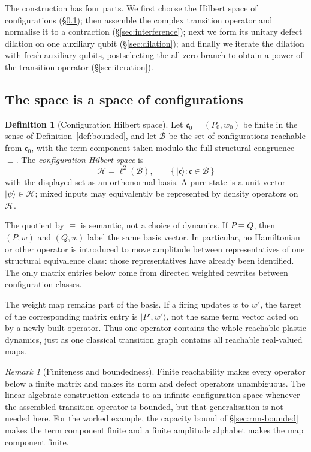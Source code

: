 \documentclass[11pt,a4paper]{article}
\theoremstyle{plain}
\theoremstyle{definition}
\newtheorem{definition}[theorem]{Definition}
\theoremstyle{remark}
\newtheorem{remark}[theorem]{Remark}
\newcommand{\wmap}{w}
\begin{document}
The construction has four parts. We first choose the Hilbert space of configurations
(\S\ref{sec:qspace}); then assemble the complex transition operator and normalise it to a contraction
(\S\ref{sec:interference}); next we form its unitary defect dilation on one auxiliary qubit
(\S\ref{sec:dilation}); and finally we iterate the dilation with fresh auxiliary qubits, postselecting the
all-zero branch to obtain a power of the transition operator (\S\ref{sec:iteration}).

\subsection{The space is a space of configurations}
\label{sec:qspace}

\begin{definition}[Configuration Hilbert space]
\label{def:hilbert}
Let $\mathfrak{c}_0=(P_0,\wmap_0)$ be finite in the sense of
Definition~\ref{def:bounded}, and let $\mathcal{B}$ be the set of configurations reachable from
$\mathfrak{c}_0$, with the term component taken modulo the full structural congruence $\equiv$. The
\emph{configuration Hilbert space} is
\[
\mathcal{H}=\ell^2(\mathcal{B}),
\qquad
\big\{\,|\mathfrak{c}\rangle : \mathfrak{c}\in\mathcal{B}\,\big\}
\]
with the displayed set as an orthonormal basis. A pure state is a unit vector
$|\psi\rangle\in\mathcal{H}$; mixed inputs may equivalently be represented by density operators on
$\mathcal{H}$.
\end{definition}

The quotient by $\equiv$ is semantic, not a choice of dynamics. If $P\equiv Q$, then
$(P,\wmap)$ and $(Q,\wmap)$ label the same basis vector. In particular, no Hamiltonian or other
operator is introduced to move amplitude between representatives of one structural equivalence
class: those representatives have already been identified. The only matrix entries below come from
directed weighted rewrites between configuration classes.

The weight map remains part of the basis. If a firing updates $\wmap$ to $\wmap'$, the target of the
corresponding matrix entry is $|P',\wmap'\rangle$, not the same term vector acted on by a newly built
operator. Thus one operator contains the whole reachable plastic dynamics, just as one classical
transition graph contains all reachable real-valued maps.

\begin{remark}[Finiteness and boundedness]
\label{rem:map-finite}
Finite reachability makes every operator below a finite matrix and makes its norm and defect operators
unambiguous. The linear-algebraic construction extends to an infinite configuration space whenever the
assembled transition operator is bounded, but that generalisation is not needed here. For the worked
example, the capacity bound of \S\ref{sec:rnn-bounded} makes the term component finite and a finite
amplitude alphabet makes the map component finite.
\end{remark}
\end{document}
